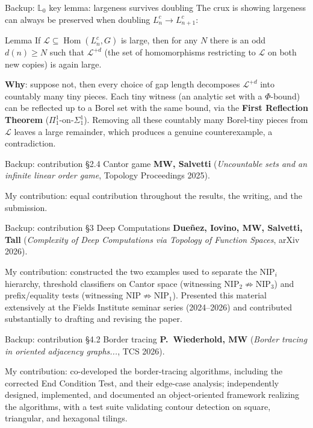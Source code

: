 \documentclass[aspectratio=169]{beamer}
\DeclareMathOperator{\Hom}{Hom}
\begin{document}
\begin{frame}{Backup: $\mathbb L_0$ key lemma: largeness survives doubling}
  The crux is showing largeness can always be preserved when doubling $L^c_n\to L^c_{n+1}$:
  \begin{block}{Lemma}
    If $\mathcal L\subseteq\Hom(L^c_n,G)$ is large, then for any $N$ there is an odd $d(n)\geq N$ such that $\mathcal L^{+d}$ (the set of homomorphisms restricting to $\mathcal L$ on both new copies) is again large.
  \end{block}
  \textbf{Why}: suppose not, then every choice of gap length decomposes $\mathcal L^{+d}$ into countably many tiny pieces. Each tiny witness (an analytic set with a $\Phi$-bound) can be reflected up to a \alert{Borel} set with the same bound, via the \textbf{First Reflection Theorem} ($\Pi^1_1$-on-$\Sigma^1_1$). Removing all these countably many Borel-tiny pieces from $\mathcal L$ leaves a large remainder, which produces a genuine counterexample, a contradiction.
\end{frame}

\begin{frame}{Backup: contribution \S2.4 Cantor game}
  \textbf{MW, Salvetti} (\emph{Uncountable sets and an infinite linear order game}, Topology Proceedings 2025).
  \vspace{0.5em}

  My contribution: equal contribution throughout the results, the writing, and the submission.
\end{frame}

\begin{frame}{Backup: contribution \S3 Deep Computations}
  \textbf{Due\~nez, Iovino, MW, Salvetti, Tall} (\emph{Complexity of Deep Computations via Topology of Function Spaces}, arXiv 2026).
  \vspace{0.5em}

  My contribution: constructed the two examples used to separate the $\mathrm{NIP}_i$ hierarchy, threshold classifiers on Cantor space (witnessing $\mathrm{NIP}_2\not\Rightarrow\mathrm{NIP}_3$) and prefix/equality tests (witnessing $\mathrm{NIP}\not\Rightarrow\mathrm{NIP}_1$). Presented this material extensively at the Fields Institute seminar series (2024--2026) and contributed substantially to drafting and revising the paper.
\end{frame}

\begin{frame}{Backup: contribution \S4.2 Border tracing}
  \textbf{P.~Wiederhold, MW} (\emph{Border tracing in oriented adjacency graphs...}, TCS 2026).
  \vspace{0.5em}

  My contribution: co-developed the border-tracing algorithms, including the corrected End Condition Test, and their edge-case analysis; independently designed, implemented, and documented an object-oriented framework realizing the algorithms, with a test suite validating contour detection on square, triangular, and hexagonal tilings.
\end{frame}
\end{document}

